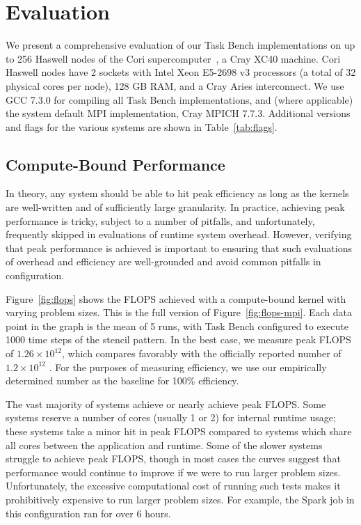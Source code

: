 \section{Evaluation}
\label{sec:evaluation}



We present a comprehensive evaluation of our Task Bench implementations on up to 256
Haswell nodes of the Cori supercomputer~\cite{Cori}, a Cray XC40
machine. Cori Haswell nodes have 2 sockets with Intel Xeon E5-2698 v3
processors (a total of 32 physical cores per node), 128 GB RAM, and a
Cray Aries interconnect. We use GCC 7.3.0 for compiling all Task Bench
implementations, and (where applicable) the system default MPI
implementation, Cray MPICH 7.7.3. Additional versions and flags for the
various systems are shown in Table~\ref{tab:flags}.

\subsection{Compute-Bound Performance}
\label{subsec:peak-performance-and-efficiency}

In theory, any system should be able to hit peak efficiency as long as
the kernels are well-written and of sufficiently large granularity. In
practice, achieving peak performance is tricky, subject to a number of
pitfalls, and unfortunately, frequently skipped in evaluations of
runtime system overhead. However, verifying that peak performance is
achieved is important to ensuring that such evaluations of overhead and
efficiency are well-grounded and avoid common pitfalls in
configuration.

Figure~\ref{fig:flops} shows the FLOPS achieved with a compute-bound
kernel with varying problem sizes. This is the full version of
Figure~\ref{fig:flops-mpi}. Each data point in the graph is the mean of 5 runs, with Task Bench configured to execute 1000 time steps of the stencil pattern. In the best case, we measure peak FLOPS of
$1.26 \times 10^{12}$, which compares favorably with the officially
reported number of $1.2 \times 10^{12}$ \cite{Cori}. For the purposes
of measuring efficiency, we use our empirically determined number as
the baseline for 100\% efficiency.




The vast majority of systems achieve or nearly achieve peak FLOPS. Some
systems reserve a number of cores (usually 1 or 2) for internal
runtime usage; these systems take a minor hit in peak FLOPS compared
to systems which share all cores between the application and runtime. Some of the
slower systems struggle to achieve peak FLOPS, though in most cases
the curves suggest that performance would continue to improve if we
were to run larger problem sizes. Unfortunately, the excessive
computational cost of running such tests makes it prohibitively
expensive to run larger problem sizes. For example, the Spark job in
this configuration ran for over 6 hours.

